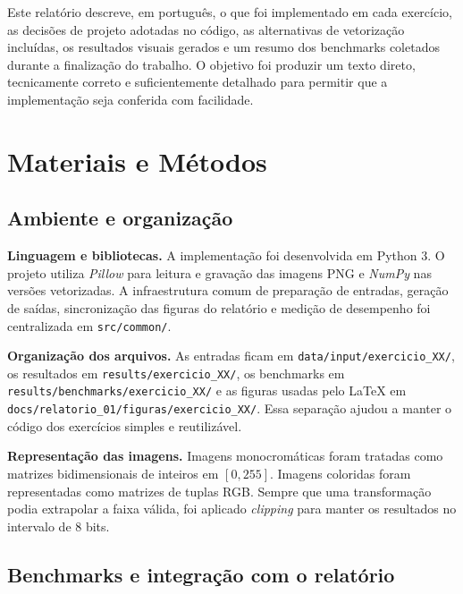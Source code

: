 \documentclass[12pt,a4paper]{article}
\newcommand{\arquivo}[1]{\nolinkurl{#1}}
\newcommand{\campo}[2]{\textbf{#1.} #2\par}
\begin{document}
Este relatório descreve, em português, o que foi implementado em cada exercício, as decisões de projeto adotadas no código, as alternativas de vetorização incluídas, os resultados visuais gerados e um resumo dos benchmarks coletados durante a finalização do trabalho. O objetivo foi produzir um texto direto, tecnicamente correto e suficientemente detalhado para permitir que a implementação seja conferida com facilidade.

\section{Materiais e Métodos}

\subsection{Ambiente e organização}

\campo{Linguagem e bibliotecas}{A implementação foi desenvolvida em Python 3. O projeto utiliza \textit{Pillow} para leitura e gravação das imagens PNG e \textit{NumPy} nas versões vetorizadas. A infraestrutura comum de preparação de entradas, geração de saídas, sincronização das figuras do relatório e medição de desempenho foi centralizada em \arquivo{src/common/}.}
\campo{Organização dos arquivos}{As entradas ficam em \arquivo{data/input/exercicio\_XX/}, os resultados em \arquivo{results/exercicio\_XX/}, os benchmarks em \arquivo{results/benchmarks/exercicio\_XX/} e as figuras usadas pelo \LaTeX{} em \arquivo{docs/relatorio_01/figuras/exercicio\_XX/}. Essa separação ajudou a manter o código dos exercícios simples e reutilizável.}
\campo{Representação das imagens}{Imagens monocromáticas foram tratadas como matrizes bidimensionais de inteiros em $[0,255]$. Imagens coloridas foram representadas como matrizes de tuplas RGB. Sempre que uma transformação podia extrapolar a faixa válida, foi aplicado \textit{clipping} para manter os resultados no intervalo de 8 bits.}

\subsection{Benchmarks e integração com o relatório}
\end{document}
